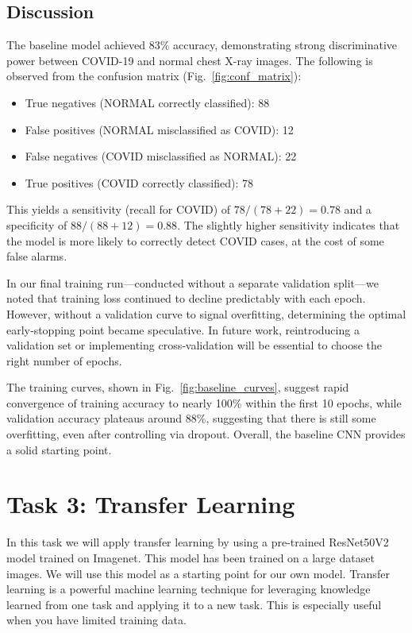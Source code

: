 \documentclass[conference]{IEEEtran}
\begin{document}
\subsection{Discussion}
The baseline model achieved 83\% accuracy, demonstrating strong discriminative power between COVID-19 and normal chest X-ray images. The following is observed from the confusion matrix (Fig.~\ref{fig:conf_matrix}):

\begin{itemize}
	\item True negatives (NORMAL correctly classified): 88
	\item False positives (NORMAL misclassified as COVID): 12
	\item False negatives (COVID misclassified as NORMAL): 22
	\item True positives (COVID correctly classified): 78
\end{itemize}

This yields a sensitivity (recall for COVID) of $78/(78+22)=0.78$ and a specificity of $88/(88+12)=0.88$. The slightly higher sensitivity indicates that the model is more likely to correctly detect COVID cases, at the cost of some false alarms.  

In our final training run—conducted without a separate validation split—we noted that training loss continued to decline predictably with each epoch. However, without a validation curve to signal overfitting, determining the optimal early‑stopping point became speculative. In future work, reintroducing a validation set or implementing cross‑validation will be essential to choose the right number of epochs.

The training curves, shown in Fig.~\ref{fig:baseline_curves}, suggest rapid convergence of training accuracy to nearly 100\% within the first 10 epochs, while validation accuracy plateaus around 88\%, suggesting that there is still some overfitting, even after controlling via dropout. Overall, the baseline CNN provides a solid starting point.






\section{Task 3: Transfer Learning} \label{sec:task_3}
In this task we will apply transfer learning by using a pre-trained ResNet50V2 model trained on Imagenet. This model has been trained on a large dataset images. We will use this model as a starting point for our own model. Transfer learning is a powerful machine learning technique for leveraging knowledge learned
from one task and applying it to a new task. This is especially useful when you have limited training data.\\
\end{document}
